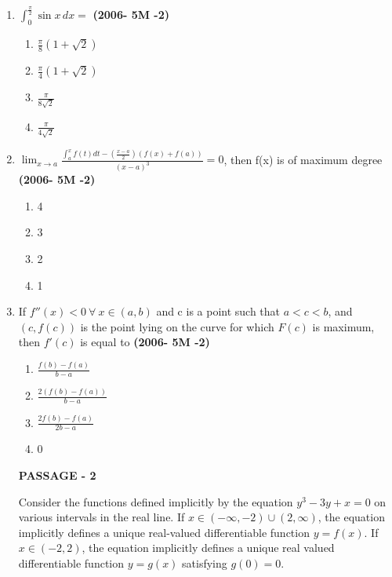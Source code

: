 \documentclass[journal,12pt,twocolumn]{IEEEtran}
\theoremstyle{remark}
\begin{document}
\begin{enumerate}
\item $\int_0^{\frac{\pi}{2}} \sin x \, dx =$
\hfill{\textbf{(2006- 5M -2)}}
\begin{enumerate}[label=(\alph*)]
    \item $ \frac{\pi}{8} ( 1 + \sqrt{2} ) $
    \item $\frac{\pi}{4} ( 1 + \sqrt{2} ) $
    \item $ \frac{\pi}{8\sqrt{2}}$
    \item  $\frac{\pi}{4\sqrt{2}}$ 
\end{enumerate}
\item $\lim_{x \to a} \frac{\int_a^x f(t)dt - (\frac{x-a}{2})(f(x) + f(a))}{(x - a)^3} = 0 $, then  f(x)  is 
 of maximum degree 
 \hfill{\textbf{(2006- 5M -2)}}
 \begin{enumerate}[label=(\alph*)]
    \item  4 
    \item  3 
    \item  2 
    \item  1
  \end{enumerate}
 \item If $ f''(x) < 0 \ \forall \ x \in (a, b) $ and  c  is a point such that $a < c < b $, and $(c, f(c))$ is the point lying on the curve for which $F(c) $ is maximum, then $f'(c) $ is equal to
 \hfill{\textbf{(2006- 5M -2)}}
 \begin{enumerate}[label=(\alph*)]
    \item  $\frac{f(b) - f(a)}{b - a} $
    \item  $ \frac{2(f(b) - f(a))}{b - a} $
    \item  $ \frac{2f(b) - f(a)}{2b - a} $
    \item  0
\end{enumerate}
\textbf{PASSAGE - 2}
 
 Consider the functions defined implicitly by the equation 
$y^3 - 3y + x = 0$
on various intervals in the real line. If $ x \in (-\infty, -2) \cup (2, \infty) $, the equation implicitly defines a unique real-valued differentiable function $ y = f(x) $. If $x \in (-2, 2)$, the equation implicitly defines a unique real valued differentiable function $y = g(x)$ satisfying $ g(0) = 0$.


\end{enumerate}
\end{document}
